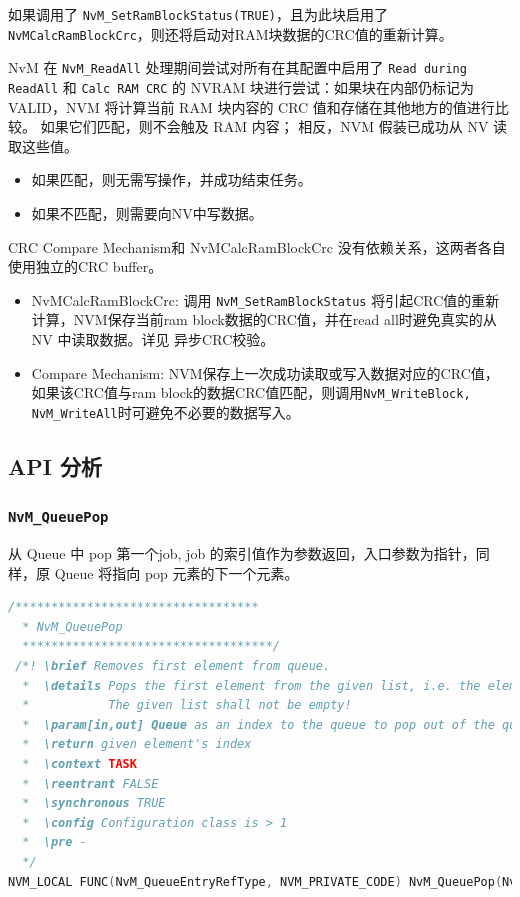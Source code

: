 如果调用了
\lstinline{NvM_SetRamBlockStatus(TRUE)}，且为此块启用了\lstinline{NvMCalcRamBlockCrc}，则还将启动对RAM块数据的CRC值的重新计算。

NvM 在 \lstinline{NvM_ReadAll} 处理期间尝试对所有在其配置中启用了 \lstinline{Read during ReadAll} 和 \lstinline{Calc RAM CRC} 的
NVRAM 块进行尝试：如果块在内部仍标记为 VALID，NVM 将计算当前 RAM
块内容的 CRC 值和存储在其他地方的值进行比较。 如果它们匹配，则不会触及
RAM 内容； 相反，NVM 假装已成功从 NV 读取这些值。

\begin{itemize}
\item
  如果匹配，则无需写操作，并成功结束任务。
\item
  如果不匹配，则需要向NV中写数据。
\end{itemize}

CRC Compare Mechanism和 NvMCalcRamBlockCrc
没有依赖关系，这两者各自使用独立的CRC buffer。

\begin{itemize}
\item
  NvMCalcRamBlockCrc:
  调用 \lstinline{NvM_SetRamBlockStatus} 将引起CRC值的重新计算，NVM保存当前ram
  block数据的CRC值，并在read all时避免真实的从NV
  中读取数据。详见 异步CRC校验。
\item
  Compare Mechanism:
  NVM保存上一次成功读取或写入数据对应的CRC值，如果该CRC值与ram
  block的数据CRC值匹配，则调用\lstinline{NvM_WriteBlock, NvM_WriteAll}时可避免不必要的数据写入。
\end{itemize}

\subsection{API 分析}
\subsubsection{\lstinline{NvM_QueuePop}}

从 Queue 中 pop 第一个job, job 的索引值作为参数返回，入口参数为指针，同样，原 Queue 将指向 pop 元素的下一个元素。

\begin{lstlisting}[language=C,style=C]
  /**********************************
  * NvM_QueuePop
  ***********************************/
 /*! \brief Removes first element from queue.
  *  \details Pops the first element from the given list, i.e. the element is removed from the list and will be returned.
  *           The given list shall not be empty!
  *  \param[in,out] Queue as an index to the queue to pop out of the queue. Caller has to ensure validity.
  *  \return given element's index
  *  \context TASK
  *  \reentrant FALSE
  *  \synchronous TRUE
  *  \config Configuration class is > 1
  *  \pre -
  */
NVM_LOCAL FUNC(NvM_QueueEntryRefType, NVM_PRIVATE_CODE) NvM_QueuePop(NvM_QueueListHeadRefType Queue);
\end{lstlisting}

